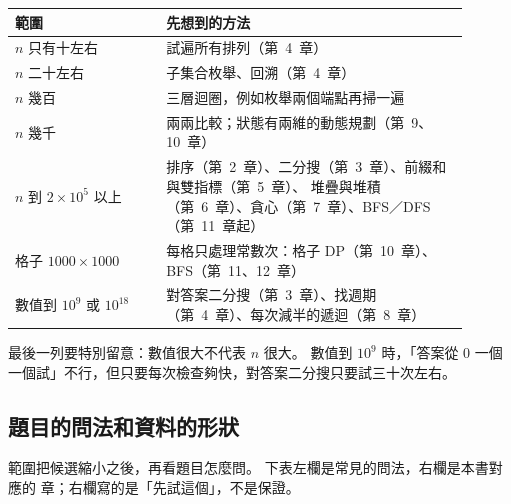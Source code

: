 \begin{center}
\begin{tabular}{p{0.3\linewidth}p{0.6\linewidth}}
\toprule
範圍 & 先想到的方法 \\
\midrule
$n$ 只有十左右 & 試遍所有排列（第~4~章） \\
$n$ 二十左右 & 子集合枚舉、回溯（第~4~章） \\
$n$ 幾百 & 三層迴圈，例如枚舉兩個端點再掃一遍 \\
$n$ 幾千 & 兩兩比較；狀態有兩維的動態規劃（第~9、10~章） \\
$n$ 到 $2 \times 10^5$ 以上 & 排序（第~2~章）、二分搜（第~3~章）、前綴和與雙指標（第~5~章）、
堆疊與堆積（第~6~章）、貪心（第~7~章）、BFS／DFS（第~11~章起） \\
格子 $1000 \times 1000$ & 每格只處理常數次：格子 DP（第~10~章）、BFS（第~11、12~章） \\
數值到 $10^9$ 或 $10^{18}$ & 對答案二分搜（第~3~章）、找週期（第~4~章）、每次減半的遞迴（第~8~章） \\
\bottomrule
\end{tabular}
\end{center}

最後一列要特別留意：數值很大不代表 $n$ 很大。 數值到 $10^9$ 時，「答案從 $0$
一個一個試」不行，但只要每次檢查夠快，對答案二分搜只要試三十次左右。

\subsection{題目的問法和資料的形狀}

範圍把候選縮小之後，再看題目怎麼問。 下表左欄是常見的問法，右欄是本書對應的
章；右欄寫的是「先試這個」，不是保證。


